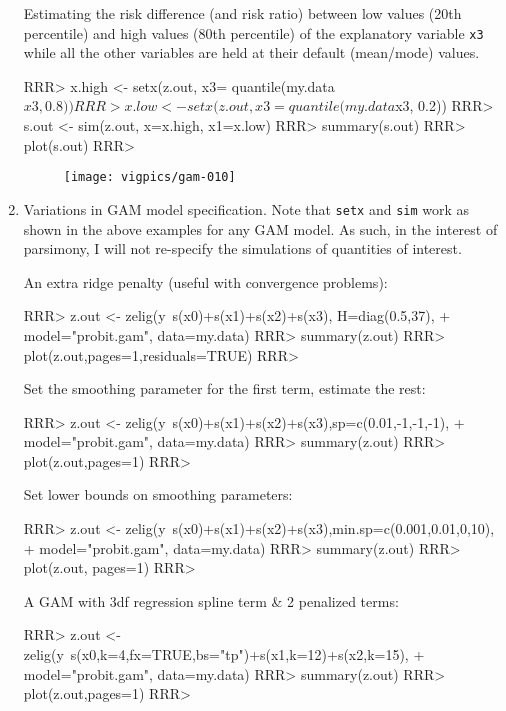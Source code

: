 \begin{enumerate}
Estimating the risk difference (and risk ratio) between low values (20th percentile) and high values (80th percentile) of the explanatory variable {\tt x3} while all the other variables are held at their default (mean/mode) values. 

\begin{Schunk}
\begin{Sinput}
RRR> x.high <- setx(z.out,  x3= quantile(my.data$x3, 0.8))
RRR> x.low <- setx(z.out, x3 = quantile(my.data$x3, 0.2))
RRR> s.out <- sim(z.out, x=x.high, x1=x.low)
RRR> summary(s.out)
RRR> plot(s.out)
RRR> 
\end{Sinput}
\end{Schunk}
\begin{figure}[here]
\centering
\texttt{[image: vigpics/gam-010]}
\label{fig:plotgam}
\end{figure}

\item Variations in GAM model specification. Note that {\tt setx} and {\tt sim} work as shown in the above examples for any GAM model. As such, in the interest of parsimony, I will not re-specify the simulations of quantities of interest. 

An extra ridge penalty (useful with convergence problems):
\begin{Schunk}
\begin{Sinput}
RRR> z.out <- zelig(y~s(x0)+s(x1)+s(x2)+s(x3), H=diag(0.5,37), 
+    model="probit.gam", data=my.data) 
RRR> summary(z.out)
RRR> plot(z.out,pages=1,residuals=TRUE)
RRR> 
\end{Sinput}
\end{Schunk}
Set the smoothing parameter for the first term, estimate the rest:
\begin{Schunk}
\begin{Sinput}
RRR> z.out <- zelig(y~s(x0)+s(x1)+s(x2)+s(x3),sp=c(0.01,-1,-1,-1), 
+    model="probit.gam", data=my.data)
RRR> summary(z.out)
RRR> plot(z.out,pages=1)
RRR> 
\end{Sinput}
\end{Schunk}
Set lower bounds on smoothing parameters:
\begin{Schunk}
\begin{Sinput}
RRR> z.out <- zelig(y~s(x0)+s(x1)+s(x2)+s(x3),min.sp=c(0.001,0.01,0,10),  
+     model="probit.gam", data=my.data) 
RRR> summary(z.out)
RRR> plot(z.out, pages=1)
RRR> 
\end{Sinput}
\end{Schunk}
A GAM with 3df regression spline term \& 2 penalized terms:
\begin{Schunk}
\begin{Sinput}
RRR> z.out <-zelig(y~s(x0,k=4,fx=TRUE,bs="tp")+s(x1,k=12)+s(x2,k=15), 
+     model="probit.gam", data=my.data)
RRR> summary(z.out)
RRR> plot(z.out,pages=1)
RRR> 
\end{Sinput}
\end{Schunk}
\end{enumerate}



